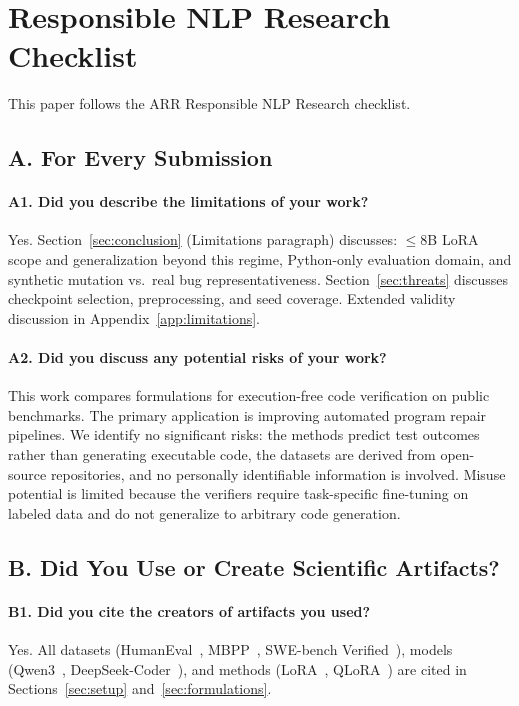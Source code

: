 
\section*{Responsible NLP Research Checklist}

This paper follows the ARR Responsible NLP Research checklist.

\subsection*{A. For Every Submission}

\paragraph{A1. Did you describe the limitations of your work?}
Yes. Section~\ref{sec:conclusion} (Limitations paragraph) discusses: ${\leq}$8B LoRA scope and generalization beyond this regime, Python-only evaluation domain, and synthetic mutation vs.\ real bug representativeness. Section~\ref{sec:threats} discusses checkpoint selection, preprocessing, and seed coverage. Extended validity discussion in Appendix~\ref{app:limitations}.

\paragraph{A2. Did you discuss any potential risks of your work?}
This work compares formulations for execution-free code verification on public benchmarks. The primary application is improving automated program repair pipelines. We identify no significant risks: the methods predict test outcomes rather than generating executable code, the datasets are derived from open-source repositories, and no personally identifiable information is involved. Misuse potential is limited because the verifiers require task-specific fine-tuning on labeled data and do not generalize to arbitrary code generation.

\subsection*{B. Did You Use or Create Scientific Artifacts?}

\paragraph{B1. Did you cite the creators of artifacts you used?}
Yes. All datasets (HumanEval~\cite{chen2021humaneval}, MBPP~\cite{austin2021mbpp}, SWE-bench Verified~\cite{chowdhury2024swebenchverified}), models (Qwen3~\cite{qwen2025qwen3}, DeepSeek-Coder~\cite{guo2024deepseekcoder}), and methods (LoRA~\cite{hu2022lora}, QLoRA~\cite{dettmers2024qlora}) are cited in Sections~\ref{sec:setup} and~\ref{sec:formulations}.

